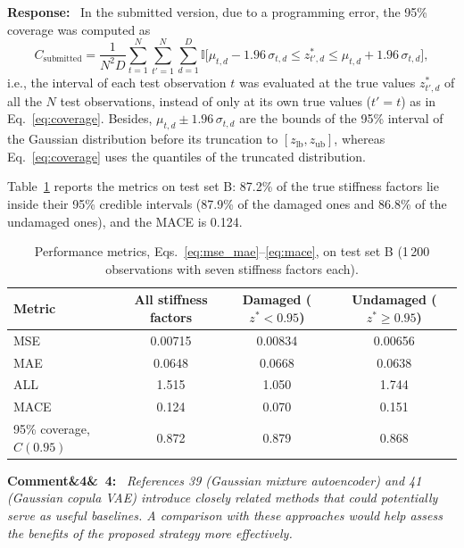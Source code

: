 \documentclass[11pt]{article}
\newenvironment{rcomment}[1]{\par\bigskip\noindent\textbf{Comment\ifx&#1&\else\ #1\fi:}\ \itshape}{\par}
\newenvironment{response}{\par\smallskip\noindent\color{resp}\textbf{Response:}\ }{\par}
\begin{document}
\begin{response}
	In the submitted version, due to a programming error, the 95\% coverage was computed as
	\begin{equation*}
		C_{\text{submitted}}=\frac{1}{N^2D}\sum_{t=1}^{N}\sum_{t'=1}^{N}\sum_{d=1}^{D}
		\mathbb{I}\big[\mu_{t,d}-1.96\,\sigma_{t,d}\le z^*_{t',d}\le\mu_{t,d}+1.96\,\sigma_{t,d}\big],
	\end{equation*}
	i.e., the interval of each test observation $t$ was evaluated at the true values $z^*_{t',d}$ of all the $N$ test
	observations, instead of only at its own true values ($t'=t$) as in Eq.~\eqref{eq:coverage}. Besides,
	$\mu_{t,d}\pm1.96\,\sigma_{t,d}$ are the bounds of the 95\% interval of the Gaussian distribution before its
	truncation to $[z_{\text{lb}},z_{\text{ub}}]$, whereas Eq.~\eqref{eq:coverage} uses the quantiles of the truncated
	distribution.

	Table~\ref{tab:metricsB} reports the metrics on test set B: 87.2\% of the true stiffness factors lie inside their 95\%
	credible intervals (87.9\% of the damaged ones and 86.8\% of the undamaged ones), and the MACE is 0.124.
	
	\begin{table}[H]
		\centering\small
		\caption{Performance metrics, Eqs.~\eqref{eq:mse_mae}--\eqref{eq:mace}, on test set B (1\,200 observations with seven
			stiffness factors each).}
		\label{tab:metricsB}
		\begin{tabular}{lccc}
			\toprule
			Metric & All stiffness factors & Damaged ($z^*<0.95$) & Undamaged ($z^*\ge0.95$) \\
			\midrule
			MSE & 0.00715 & 0.00834 & 0.00656 \\
			MAE & 0.0648 & 0.0668 & 0.0638 \\
			ALL & 1.515 & 1.050 & 1.744 \\
			MACE & 0.124 & 0.070 & 0.151 \\
			95\% coverage, $C(0.95)$ & 0.872 & 0.879 & 0.868 \\
			\bottomrule
		\end{tabular}
	\end{table}
\end{response}


%

\begin{rcomment}{4}
References 39 (Gaussian mixture autoencoder) and 41 (Gaussian copula VAE) introduce closely related methods that could
potentially serve as useful baselines. A comparison with these approaches would help assess the benefits of the proposed
strategy more effectively.
\end{rcomment}
\end{document}
